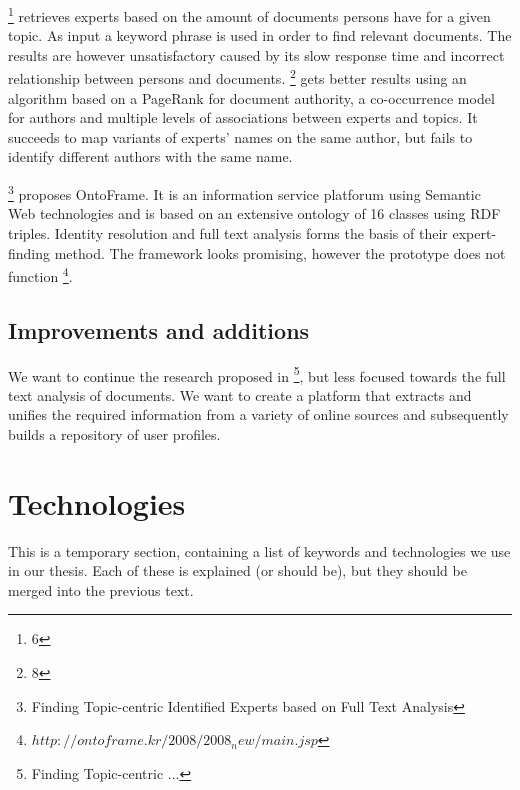 \footnote{6} retrieves experts based on the amount of documents persons have for a given topic. As input a keyword phrase is used in order to find relevant documents. The results are however unsatisfactory caused by its slow response time and incorrect relationship between persons and documents. \footnote{8} gets better results using an algorithm based on a PageRank for document authority, a co-occurrence model for authors and multiple levels of associations between experts and topics. It succeeds to map variants of experts' names on the same author, but fails to identify different authors with the same name.

\footnote{Finding Topic-centric Identified Experts based on Full Text Analysis} proposes OntoFrame. It is an information service platforum using Semantic Web technologies and is based on an extensive ontology of 16 classes using RDF triples. Identity resolution and full text analysis forms the basis of their expert-finding method. The framework looks promising, however the prototype does not function \footnote{$http://ontoframe.kr/2008/2008_new/main.jsp$}.

\subsection{Improvements and additions}


We want to continue the research proposed in \footnote{Finding Topic-centric ...}, but less focused towards the full text analysis of documents. We want to create a platform that extracts and unifies the required information from a variety of online sources and subsequently builds a repository of user profiles.


\section{Technologies}

This is a temporary section, containing a list of keywords and technologies we use in our thesis. Each of these is explained (or should be), but they should be merged into the previous text.


